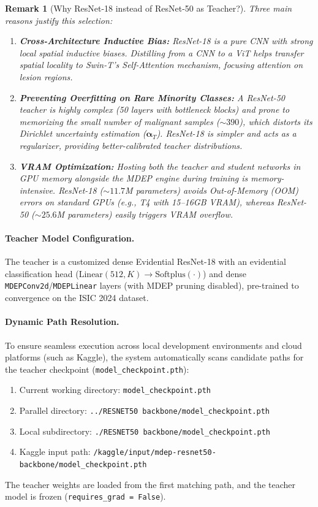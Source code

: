 \documentclass[11pt, a4paper]{article}
\newcommand{\softplus}{\text{Softplus}}
\newtheorem{remark}{Remark}
\begin{document}
\begin{remark}[Why ResNet-18 instead of ResNet-50 as Teacher?]
Three main reasons justify this selection:
\begin{enumerate}[label=(\roman*)]
    \item \textbf{Cross-Architecture Inductive Bias:} ResNet-18 is a pure CNN with strong local spatial inductive biases. Distilling from a CNN to a ViT helps transfer spatial locality to Swin-T's Self-Attention mechanism, focusing attention on lesion regions.
    \item \textbf{Preventing Overfitting on Rare Minority Classes:} A ResNet-50 teacher is highly complex (50 layers with bottleneck blocks) and prone to memorizing the small number of malignant samples (${\sim}390$), which distorts its Dirichlet uncertainty estimation ($\bm{\alpha}_T$). ResNet-18 is simpler and acts as a regularizer, providing better-calibrated teacher distributions.
    \item \textbf{VRAM Optimization:} Hosting both the teacher and student networks in GPU memory alongside the MDEP engine during training is memory-intensive. ResNet-18 (${\sim}11.7$M parameters) avoids Out-of-Memory (OOM) errors on standard GPUs (e.g., T4 with 15--16GB VRAM), whereas ResNet-50 (${\sim}25.6$M parameters) easily triggers VRAM overflow.
\end{enumerate}
\end{remark}

\paragraph{Teacher Model Configuration.}
The teacher is a customized dense Evidential ResNet-18 with an evidential classification head ($\text{Linear}(512, K) \to \softplus(\cdot)$) and dense \texttt{MDEPConv2d}/\texttt{MDEPLinear} layers (with MDEP pruning disabled), pre-trained to convergence on the ISIC 2024 dataset.

\paragraph{Dynamic Path Resolution.}
To ensure seamless execution across local development environments and cloud platforms (such as Kaggle), the system automatically scans candidate paths for the teacher checkpoint (\texttt{model\_checkpoint.pth}):
\begin{enumerate}
    \item Current working directory: \texttt{model\_checkpoint.pth}
    \item Parallel directory: \texttt{../RESNET50 backbone/model\_checkpoint.pth}
    \item Local subdirectory: \texttt{./RESNET50 backbone/model\_checkpoint.pth}
    \item Kaggle input path: \texttt{/kaggle/input/mdep-resnet50-backbone/model\_checkpoint.pth}
\end{enumerate}
The teacher weights are loaded from the first matching path, and the teacher model is frozen (\texttt{requires\_grad = False}).
\end{document}
